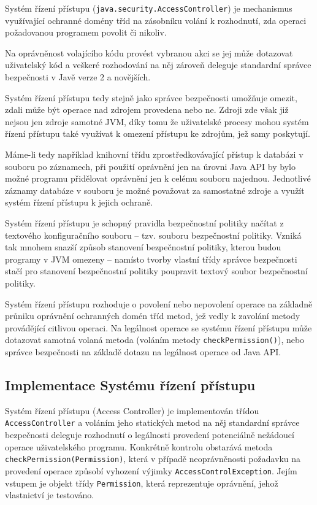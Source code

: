 Systém řízení přístupu ({\tt java.security.AccessController}) je mechanismus využívající ochranné domény tříd na zásobníku volání k rozhodnutí, zda operaci požadovanou programem povolit či nikoliv. 

Na oprávněnost volajícího kódu provést vybranou akci se jej může dotazovat uživatelský kód a veškeré rozhodování na něj zároveň deleguje standardní správce bezpečnosti v Javě verze 2 a novějších. \cite[5]{oaks}

Systém řízení přístupu tedy stejně jako správce bezpečnosti umožňuje omezit, zdali může být operace nad zdrojem provedena nebo ne. Zdroji zde však již nejsou jen zdroje samotné JVM, díky tomu že uživatelské procesy mohou systém řízení přístupu také využívat k omezení přístupu ke zdrojům, jež samy poskytují. \cite[5]{oaks}

Máme-li tedy například knihovní třídu zprostředkovávající přístup k databázi v souboru po záznamech, při použití oprávnění jen na úrovni Java API by bylo možné programu přidělovat oprávnění jen k celému souboru najednou. Jednotlivé záznamy databáze v souboru je možné považovat za samostatné zdroje a využít systém řízení přístupu k jejich ochraně.

Systém řízení přístupu je schopný pravidla bezpečnostní politiky načítat z textového konfiguračního souboru -- tzv. souboru bezpečnostní politiky. Vzniká tak mnohem snazší způsob stanovení bezpečnostní politiky, kterou budou programy v JVM omezeny -- namísto tvorby vlastní třídy správce bezpečnosti stačí pro stanovení bezpečnostní politiky poupravit textový soubor bezpečnostní politiky. \cite[5]{oaks}

Systém řízení přístupu rozhoduje o povolení nebo nepovolení operace na základně průniku oprávnění ochranných domén tříd metod, jež vedly k zavolání metody provádějící citlivou operaci. Na legálnost operace se systému řízení přístupu může dotazovat samotná volaná metoda (voláním metody {\tt checkPermission()}), nebo správce bezpečnosti na základě dotazu na legálnost operace od Java API.

\subsection{Implementace Systému řízení přístupu}\label{implementaceAC}

Systém řízení přístupu (Access Controller) je implementován třídou {\tt AccessController} a voláním jeho statických metod na něj standardní správce bezpečnosti deleguje rozhodnutí o legálnosti provedení potenciálně nežádoucí operace uživatelského programu. Konkrétně kontrolu obstarává metoda {\tt checkPermission(Permission)}, která v případě neoprávněnosti požadavku na provedení operace způsobí vyhození výjimky {\tt AccessControlException}. Jejím vstupem je objekt třídy {\tt Permission}, která reprezentuje oprávnění, jehož vlastnictví je testováno. \cite[5.5]{oaks}\cite[6]{oaks}

